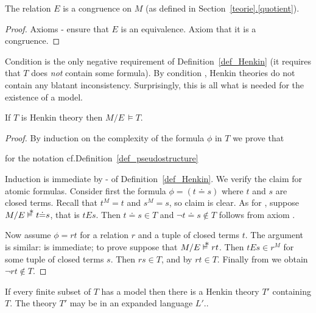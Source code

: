 \documentclass[creche.tex]{subfiles}
\begin{document}
\begin{lemma}
The relation $E$ is a congruence on $M$ (as defined in Section~\hyperref[quotient]{\ref*{teorie}.\ref*{quotient}}).
\end{lemma}

\begin{proof}
Axioms - ensure that $E$ is an equivalence. Axiom  that it is a congruence.
\end{proof}

Condition  is the only negative requirement of Definition~\ref{def_Henkin} (it requires that $T$ does \textit{not\/} contain some formula). By condition , Henkin theories do not contain any blatant inconsistency. Surprisingly, this is all what is needed for the existence of a model.

\begin{theorem}
If $T$ is Henkin theory then $M/E\,\models T$. 
\end{theorem}

\begin{proof}
By induction on the complexity of the formula $\phi$ in $T$ we prove that

\hfill for the notation cf.\@ Definition~\ref{def_pseudostructure}


Induction is immediate by - of Definition~\ref{def_Henkin}. We verify the claim for atomic formulas. Consider first the formula $\phi= (t{\doteq}s)$ where $t$ and $s$ are closed terms. Recall that $t^M=t$ and $s^M=s$, so claim  is clear. As for , suppose $M/E\pmodels t{\doteq}s$, that is  $tEs$. Then $t{\doteq}s\in T$ and $\neg t{\doteq}s\notin T$ follows from axiom .

Now assume $\phi=rt$ for a relation $r$ and a tuple of closed terms $t$. The argument is similar:  is immediate; to prove  suppose that $M/E\pmodels rt$. Then $tEs\in r^M$ for some tuple of closed terms $s$. Then $rs\in T$, and by  $rt\in T$. Finally from  we obtain $\neg rt\notin T$.
\end{proof}

\begin{proposition}\label{prop_Henkin}If every finite subset of $T$ has a model then there is a Henkin theory $T'$ containing $T$. The theory $T'$ may be in an expanded language $L'$..
\end{proposition}
\end{document}
